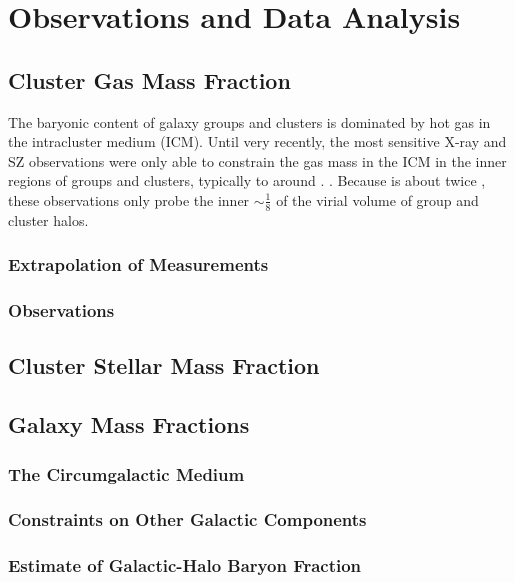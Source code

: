 \chapter{Observations and Data Analysis}
\label{c.Data}
\section{Cluster Gas Mass Fraction}
\label{s.Gas}
The baryonic content of galaxy groups and clusters is dominated by hot gas in the
intracluster medium (ICM). Until very recently, the most sensitive
X-ray and SZ observations were only able to constrain the gas mass in
the ICM in the inner regions of groups and clusters, typically to
around \rfive. .  Because \rfive{} is about twice \rvir{}, these observations
only probe the inner $\sim \frac{1}{8}$ of the virial volume of group
and cluster halos. 

\subsection{Extrapolation of Measurements}
\label{s.Gas.Extrapolation}

\subsection{Observations}
\label{s.Gas.Observations}

\section{Cluster Stellar Mass Fraction}
\label{s.Stellar}

\section{Galaxy Mass Fractions}
\label{s.Galaxy}

\subsection{The Circumgalactic Medium}
\label{s.Galaxy.CGM}

\subsection{Constraints on Other Galactic Components}
\label{s.Galaxy.Components}

\subsection{Estimate of Galactic-Halo Baryon Fraction}
\label{s.Galaxy.Fraction}
